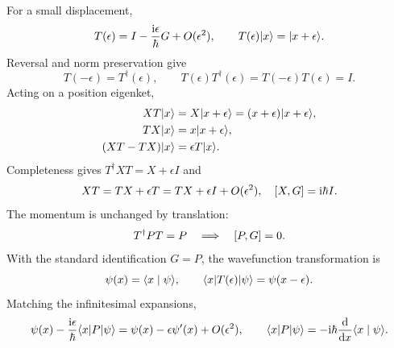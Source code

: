 For a small displacement,
\[
 T(\epsilon)=I-\frac{\mathrm{i}\epsilon}{\hbar}G+O(\epsilon^2),\qquad
 T(\epsilon)\lvert x\rangle=\lvert x+\epsilon\rangle.
\]
Reversal and norm preservation give
\[
 T(-\epsilon)=T^\dagger(\epsilon),\qquad
 T(\epsilon)T^\dagger(\epsilon)=T(-\epsilon)T(\epsilon)=I.
\]
Acting on a position eigenket,
\begin{align*}
 XT\lvert x\rangle&=X\lvert x+\epsilon\rangle=(x+\epsilon)\lvert x+\epsilon\rangle,\\
 TX\lvert x\rangle&=x\lvert x+\epsilon\rangle,\\
 (XT-TX)\lvert x\rangle&=\epsilon T\lvert x\rangle.
\end{align*}
Completeness gives $T^\dagger XT=X+\epsilon I$ and
\[
 XT=TX+\epsilon T=TX+\epsilon I+O(\epsilon^2),\quad
 \left[X,G\right]=\mathrm{i}\hbar I.
\]
The momentum is unchanged by translation:
\[
 T^\dagger PT=P\quad\Longrightarrow\quad\left[P,G\right]=0.
\]
With the standard identification $G=P$, the wavefunction transformation is
\[
 \psi(x)=\langle x\mid \psi\rangle,\qquad
 \langle x\rvert T(\epsilon)\lvert \psi\rangle=\psi(x-\epsilon).
\]
Matching the infinitesimal expansions,
\[
 \psi(x)-\frac{\mathrm{i}\epsilon}{\hbar}\langle x\rvert P\lvert \psi\rangle
 =\psi(x)-\epsilon\psi'(x)+O(\epsilon^2),
 \qquad \langle x\rvert P\lvert \psi\rangle=-\mathrm{i}\hbar\frac{\mathop{}\!\mathrm{d}}{\mathop{}\!\mathrm{d} x}\langle x\mid \psi\rangle.
\]
